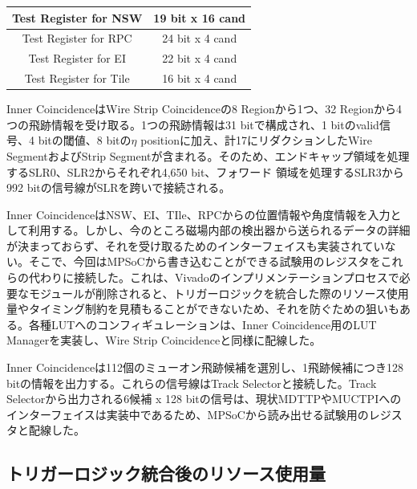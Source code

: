 \begin{table}[]
\begin{tabular}{|c|c|}
    Test Register for NSW                    & 19 bit x 16 cand                                                                                                               \\ \hline
    Test Register for RPC                    & 24 bit x 4 cand                                                                                                                \\ \hline
    Test Register for EI                     & 22 bit x 4 cand                                                                                                                \\ \hline
    Test Register for Tile                   & 16 bit x 4 cand                                                                                                                \\ \hline
    \end{tabular}
\end{table}

Inner CoincidenceはWire Strip Coincidenceの8 Regionから1つ、32 Regionから4つの飛跡情報を受け取る。1つの飛跡情報は31 bitで構成され、1 bitのvalid信号、4 bitの\pt 閾値、8 bitの$\eta$ positionに加え、計17にリダクションしたWire SegmentおよびStrip Segmentが含まれる。そのため、エンドキャップ領域を処理するSLR0、SLR2からそれぞれ4,650 bit、フォワード 領域を処理するSLR3から992 bitの信号線がSLRを跨いで接続される。

Inner CoincidenceはNSW、EI、TIle、RPCからの位置情報や角度情報を入力として利用する。しかし、今のところ磁場内部の検出器から送られるデータの詳細が決まっておらず、それを受け取るためのインターフェイスも実装されていない。そこで、今回はMPSoCから書き込むことができる試験用のレジスタをこれらの代わりに接続した。これは、Vivadoのインプリメンテーションプロセスで必要なモジュールが削除されると、トリガーロジックを統合した際のリソース使用量やタイミング制約を見積もることができないため、それを防ぐための狙いもある。各種LUTへのコンフィギュレーションは、Inner Coincidence用のLUT Managerを実装し、Wire Strip Coincidenceと同様に配線した。

Inner Coincidenceは112個のミューオン飛跡候補を選別し、1飛跡候補につき128 bitの情報を出力する。これらの信号線はTrack Selectorと接続した。Track Selectorから出力される6候補 x 128 bitの信号は、現状MDTTPやMUCTPIへのインターフェイスは実装中であるため、MPSoCから読み出せる試験用のレジスタと配線した。

\subsection{トリガーロジック統合後のリソース使用量}

